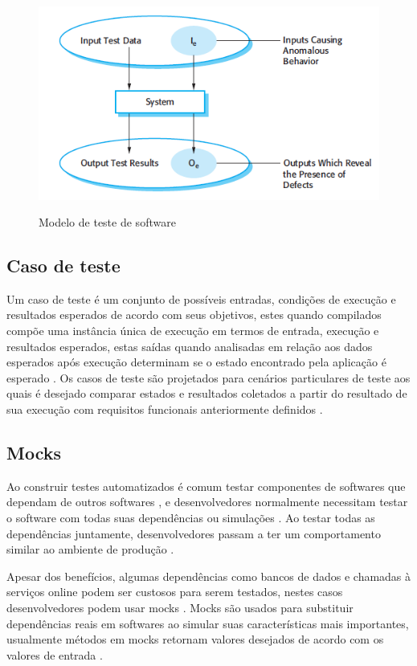 \documentclass[
	12pt,				%
	oneside,			%
	a4paper,			%
	english,			%
	brazil				%
	]{abntex2ppgsi}
\begin{document}
\begin{figure}[H]%
	\centering
 	  \caption{Modelo de teste de software}
		\includegraphics{modelo-teste.png}
	\label{fig:tipos-custo-arvore}
\end{figure}

\subsection{Caso de teste}
Um caso de teste  é um conjunto de possíveis entradas, condições de execução e resultados esperados de acordo com seus objetivos, estes quando compilados compõe uma instância única de execução em termos de entrada, execução e resultados esperados, estas saídas quando analisadas em relação aos dados esperados após execução determinam se o estado encontrado pela aplicação  é esperado \cite{Singh2014}. Os casos de teste são projetados para cenários particulares de teste aos quais é desejado comparar estados e resultados coletados a partir do resultado de sua execução com requisitos funcionais anteriormente definidos \cite{Jacob2016}.

\subsection{Mocks}
Ao construir testes automatizados é comum testar componentes de softwares que dependam de outros softwares , e desenvolvedores  normalmente necessitam testar o software com todas suas dependências ou simulações \cite{Spadini2017}. Ao testar todas as dependências juntamente, desenvolvedores passam a ter um comportamento similar ao ambiente de produção \cite{Spadini2017}.

Apesar dos benefícios, algumas dependências como bancos de dados e chamadas à serviços online podem ser custosos para serem testados, nestes casos desenvolvedores podem usar mocks \cite{Spadini2017}. Mocks são usados para substituir dependências reais em softwares ao simular suas características mais importantes, usualmente métodos em mocks  retornam valores desejados de acordo com os valores de entrada \cite{Spadini2017}. 
\end{document}
